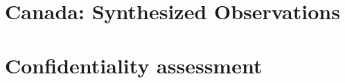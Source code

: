 





%
%

%
%

\section{Canada: Synthesized Observations}
\label{sec:synth_obs}



\section{Confidentiality assessment}
\label{sec:conf:appendix}




